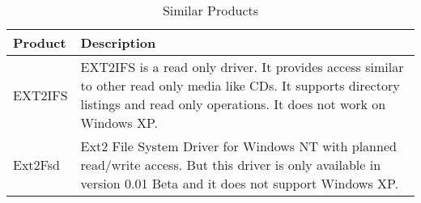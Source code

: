 \begin{longtable}{|p{2cm}|X|}
	\caption[]{\label{tab:visionSimilarProducts} Similar Products}\\
	\hline
	 \textbf{Product} &
	 \textbf{Description} \\
	\hline
	\hline
	 EXT2IFS \cite{ext2ifs} & 
	 EXT2IFS is a read only driver. It provides access similar to other read only media like CDs. It supports directory listings and read only operations. It does not work on Windows XP.\\
	\hline 
	 Ext2Fsd \cite{winext2fsd} & 
	 Ext2 File System Driver for Windows NT with planned read/write access. But this driver is only available in version 0.01 Beta and it does not support Windows XP.\\
	\hline
\end{longtable}
